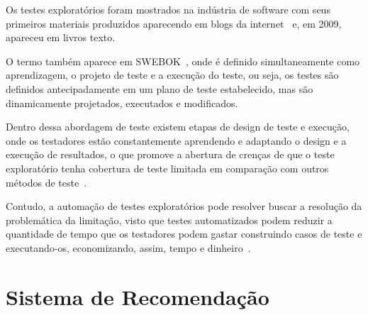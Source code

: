 Os testes exploratórios foram mostrados na indústria de software com seus primeiros materiais produzidos 
aparecendo em blogs da internet~\cite{kaner2000testing} e, em 2009, apareceu em livros texto. 

O termo também aparece em SWEBOK~\cite{bourque2014guide}, onde é definido simultaneamente como aprendizagem, o projeto de teste 
e a execução do teste, ou seja, os testes são definidos antecipadamente em um plano de teste estabelecido, mas 
são dinamicamente projetados, executados e modificados.

Dentro dessa abordagem de teste existem etapas de design de teste e execução, onde os testadores estão constantemente aprendendo e 
adaptando o design e a execução de resultados, o que promove a abertura de crenças de que o teste exploratório tenha cobertura de 
teste limitada em comparação com outros métodos de teste~\cite{schaefer2014model}.

Contudo, a automação de testes exploratórios pode resolver buscar a resolução da problemática da limitação, visto que testes 
automatizados podem reduzir a quantidade de tempo que os testadores podem gastar construindo casos de teste e executando-os, 
economizando, assim, tempo e dinheiro~\cite{dustin2009implementing}. 


\section{Sistema de Recomendação}
